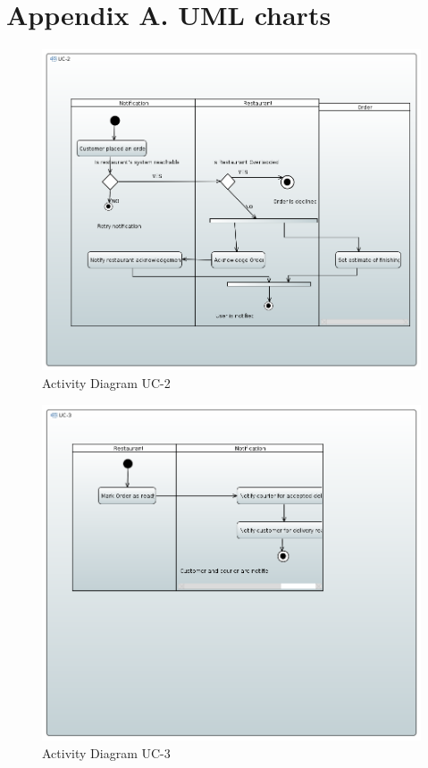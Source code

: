 \section{Appendix A. UML charts}

\begin{figure}[h!]
\begin{center}
\includegraphics[scale=0.35]{FIGS/UC-2.PNG}
    \caption{Activity Diagram UC-2}
    \label{fig:act_diag2}
\end{center}
\end{figure}

\begin{figure}[h!]
\begin{center}
\includegraphics[scale=0.35]{FIGS/UC-3.PNG}
    \caption{Activity Diagram UC-3}
    \label{fig:act_diag3}
\end{center}
\end{figure}

